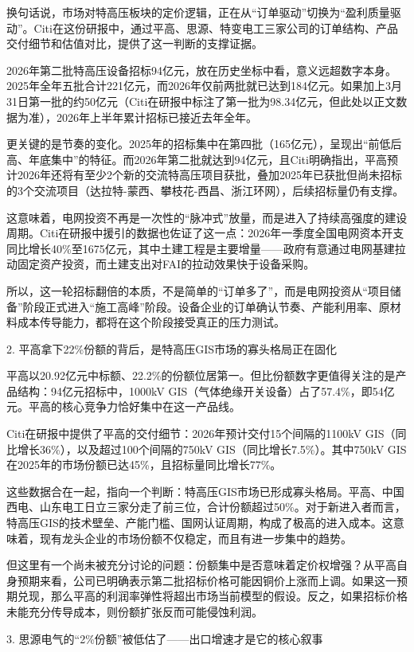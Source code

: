 \documentclass[11pt]{ctexart}
\begin{document}
换句话说，市场对特高压板块的定价逻辑，正在从“订单驱动”切换为“盈利质量驱动”。Citi在这份研报中，通过平高、思源、特变电工三家公司的订单结构、产品交付细节和估值对比，提供了这一判断的支撑证据。

2026年第二批特高压设备招标94亿元，放在历史坐标中看，意义远超数字本身。2025年全年五批合计221亿元，而2026年仅前两批就已达到184亿元。如果加上3月31日第一批的约50亿元（Citi在研报中标注了第一批为98.34亿元，但此处以正文数据为准），2026年上半年累计招标已接近去年全年。

更关键的是节奏的变化。2025年的招标集中在第四批（165亿元），呈现出“前低后高、年底集中”的特征。而2026年第二批就达到94亿元，且Citi明确指出，平高预计2026年还将有至少2个新的交流特高压项目获批，叠加2025年已获批但尚未招标的3个交流项目（达拉特-蒙西、攀枝花-西昌、浙江环网），后续招标量仍有支撑。

这意味着，电网投资不再是一次性的“脉冲式”放量，而是进入了持续高强度的建设周期。Citi在研报中援引的数据也佐证了这一点：2026年一季度全国电网资本开支同比增长40\%至1675亿元，其中土建工程是主要增量——政府有意通过电网基建拉动固定资产投资，而土建支出对FAI的拉动效果快于设备采购。

所以，这一轮招标翻倍的本质，不是简单的“订单多了”，而是电网投资从“项目储备”阶段正式进入“施工高峰”阶段。设备企业的订单确认节奏、产能利用率、原材料成本传导能力，都将在这个阶段接受真正的压力测试。

2. 平高拿下22\%份额的背后，是特高压GIS市场的寡头格局正在固化

平高以20.92亿元中标额、22.2\%的份额位居第一。但比份额数字更值得关注的是产品结构：94亿元招标中，1000kV GIS（气体绝缘开关设备）占了57.4\%，即54亿元。平高的核心竞争力恰好集中在这一产品线。

Citi在研报中提供了平高的交付细节：2026年预计交付15个间隔的1100kV GIS（同比增长36\%），以及超过100个间隔的750kV GIS（同比增长7.5\%）。其中750kV GIS在2025年的市场份额已达45\%，且招标量同比增长77\%。

这些数据合在一起，指向一个判断：特高压GIS市场已形成寡头格局。平高、中国西电、山东电工日立三家分走了前三位，合计份额超过50\%。对于新进入者而言，特高压GIS的技术壁垒、产能门槛、国网认证周期，构成了极高的进入成本。这意味着，现有龙头企业的市场份额不仅稳定，而且有进一步集中的趋势。

但这里有一个尚未被充分讨论的问题：份额集中是否意味着定价权增强？从平高自身预期来看，公司已明确表示第二批招标价格可能因铜价上涨而上调。如果这一预期兑现，那么平高的利润率弹性将超出市场当前模型的假设。反之，如果招标价格未能充分传导成本，则份额扩张反而可能侵蚀利润。

3. 思源电气的“2\%份额”被低估了——出口增速才是它的核心叙事
\end{document}
